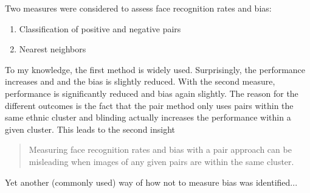 \documentclass{report}
\begin{document}
Two measures were considered to assess face recognition rates and bias:

\begin{enumerate}
	\item Classification of positive and negative pairs 
	\item Nearest neighbors
\end{enumerate}

\noindent To my knowledge, the first method is widely used. Surprisingly, the performance increases and and the bias is slightly reduced. With the second measure, performance is significantly reduced and bias again slightly. The reason for the different outcomes is the fact that the pair method only uses pairs within the same ethnic cluster and blinding actually increases the performance within a given cluster. This leads to the second insight

\begin{quote}
    Measuring face recognition rates and bias with a pair approach can be misleading when images of any given pairs are within the same cluster. 
 \end{quote}

\noindent Yet another (commonly used) way of how not to measure bias was identified...
\end{document}
